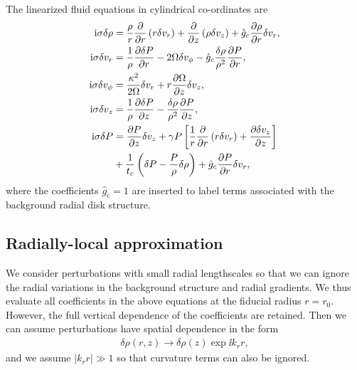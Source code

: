 The linearized fluid equations in cylindrical co-ordinates are  
\begin{align}
  \mathrm{i}\sigma\delta\rho &= \frac{\rho}{r}\frac{\partial}{\partial r}\left(r\delta v_r\right) + \frac{\partial}{\partial
    z}\left(\rho\delta v_z\right)  + \hat{g}_c\frac{\partial\rho}{\partial r}\delta v_r,\\
  \mathrm{i}\sigma\delta v_r &= \frac{1}{\rho}\frac{\partial\delta P}{\partial r} - 2\Omega
  \delta v_\phi - \hat{g}_c\frac{\delta\rho}{\rho^2}\frac{\partial P}{\partial r},\\ 
  \mathrm{i}\sigma\delta v_\phi  &= \frac{\kappa^2}{2\Omega}\delta v_r +
  r\frac{\partial\Omega}{\partial z}\delta v_z,\\
  \mathrm{i} \sigma\delta v_z &= \frac{1}{\rho}\frac{\partial\delta P}{\partial z} -
  \frac{\delta \rho}{\rho^2}\frac{\partial P}{\partial z},\\
  \mathrm{i}\sigma\delta P &=\frac{\partial P}{\partial z}\delta v_z + \gamma P
  \left[\frac{1}{r}\frac{\partial}{\partial r}\left(r\delta v_r\right) + \frac{\partial
      \delta v_z}{\partial z}\right]\notag \\
  &+ \frac{1}{t_c}\left(\delta P -  
    \frac{P}{\rho}\delta\rho\right) + \hat{g}_c \frac{\partial P}{\partial r}\delta v_r,\label{full_energy1}
\end{align}
where the coefficients $\hat{g}_c=1$ are inserted to label terms
associated with the background radial disk structure. 

\subsection{Radially-local approximation}  
We consider perturbations with small radial lengthscales 
so that we can ignore the radial variations in the background
structure and radial gradients. We thus evaluate all coefficients in
the above equations at the fiducial radius $r=r_0$. However, the full
vertical dependence of the coefficients are retained. Then we can
assume perturbations have spatial dependence in the form
\begin{align}
  \delta \rho(r,z) \to \delta\rho(z)\exp{\ii k_r r},
\end{align}
and we assume $|k_rr|\gg1$ so that curvature terms can also be
ignored.       

